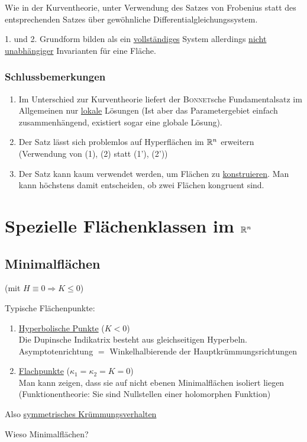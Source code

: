 \begin{beweis}
 Wie in der Kurventheorie, unter Verwendung des Satzes von Frobenius statt des entsprechenden Satzes über gewöhnliche Differentialgleichungssystem. \par
 1. und 2. Grundform bilden als ein \uline{vollständiges} System allerdings \uline{nicht unabhängiger} Invarianten für eine Fläche.
\end{beweis}
\subsubsection{Schlussbemerkungen}
\begin{enumerate}
 \item Im Unterschied zur Kurventheorie liefert der \textsc{Bonnet}sche Fundamentalsatz im Allgemeinen nur \uline{lokale} Lösungen (Ist aber das Parametergebiet einfach zusammenhängend, existiert sogar eine globale Lösung).
 \item Der Satz lässt sich problemlos auf Hyperflächen im \(\mathbb{R}^n\) erweitern (Verwendung von (1), (2) statt (1'), (2'))
 \item Der Satz kann kaum verwendet werden, um Flächen zu \uline{konstruieren}. Man kann höchstens damit entscheiden, ob zwei Flächen kongruent sind.
\end{enumerate}

\section{Spezielle Flächenklassen im $\mathbb{R}^n$}
\subsection{Minimalflächen}
(mit \(H \equiv 0 \Rightarrow K \le 0\)) \par
Typische Flächenpunkte:
\begin{enumerate}
 \item \uline{Hyperbolische Punkte} (\(K < 0\)) \\
 Die Dupinsche Indikatrix besteht aus gleichseitigen Hyperbeln. Asymptotenrichtung \(=\) Winkelhalbierende der Hauptkrümmungsrichtungen
 \item \uline{Flachpunkte} (\(\kappa_1 = \kappa_2 = K = 0\)) \\
 Man kann zeigen, dass sie auf nicht ebenen Minimalflächen isoliert liegen (Funktionentheorie: Sie sind Nullstellen einer holomorphen Funktion)
\end{enumerate}
Also \uline{symmetrisches Krümmungsverhalten} \par
Wieso Minimalflächen?

